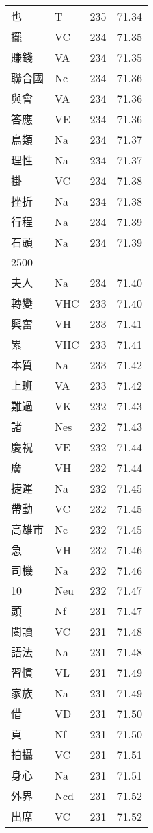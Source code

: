 \documentclass[twocolumn]{book}
\begin{document}
\begin{supertabular}{llrr}
也 & T & 235 &  71.34\\
擺 & VC & 234 &  71.35\\
賺錢 & VA & 234 &  71.35\\
聯合國 & Nc & 234 &  71.36\\
與會 & VA & 234 &  71.36\\
答應 & VE & 234 &  71.36\\
鳥類 & Na & 234 &  71.37\\
理性 & Na & 234 &  71.37\\
掛 & VC & 234 &  71.38\\
挫折 & Na & 234 &  71.38\\
行程 & Na & 234 &  71.39\\
石頭 & Na & 234 &  71.39\\
2500\\
夫人 & Na & 234 &  71.40\\
轉變 & VHC & 233 &  71.40\\
興奮 & VH & 233 &  71.41\\
累 & VHC & 233 &  71.41\\
本質 & Na & 233 &  71.42\\
上班 & VA & 233 &  71.42\\
難過 & VK & 232 &  71.43\\
諸 & Nes & 232 &  71.43\\
慶祝 & VE & 232 &  71.44\\
廣 & VH & 232 &  71.44\\
捷運 & Na & 232 &  71.45\\
帶動 & VC & 232 &  71.45\\
高雄市 & Nc & 232 &  71.45\\
急 & VH & 232 &  71.46\\
司機 & Na & 232 &  71.46\\
10 & Neu & 232 &  71.47\\
頭 & Nf & 231 &  71.47\\
閱讀 & VC & 231 &  71.48\\
語法 & Na & 231 &  71.48\\
習慣 & VL & 231 &  71.49\\
家族 & Na & 231 &  71.49\\
借 & VD & 231 &  71.50\\
頁 & Nf & 231 &  71.50\\
拍攝 & VC & 231 &  71.51\\
身心 & Na & 231 &  71.51\\
外界 & Ncd & 231 &  71.52\\
出席 & VC & 231 &  71.52\\

\end{supertabular}
\end{document}
